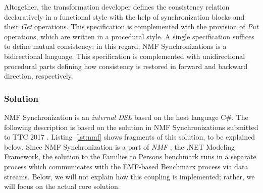 Altogether, the transformation developer defines the consistency relation declaratively in a functional style with the help of synchronization blocks and their \emph{Get} operations. This specification is complemented with the provision of \emph{Put} operations, which are written in a procedural style. A single specification suffices to define mutual consistency; in this regard, NMF Synchronizations is a bidirectional language. This specification is complemented with unidirectional procedural parts defining how consistency is restored in forward and backward direction, respectively.

\subsubsection{Solution}
\label{sec:solutionNMF}

NMF Synchronization is an \emph{internal DSL} based on the host language C\#. The following description is based on the solution in NMF Synchronizations submitted to TTC 2017 \cite{Hinkel2017}. Listing~\ref{lst:nmf} shows fragments of this solution, to be explained below. Since NMF Synchronization is a part of \emph{NMF} \cite{Hinkel2016}, the .NET Modeling Framework, the solution to the Families to Persons benchmark runs in a separate process which communicates with the EMF-based Benchmarx process via data streams. Below, we will not explain how this coupling is implemented; rather, we will focus on the actual core solution.





